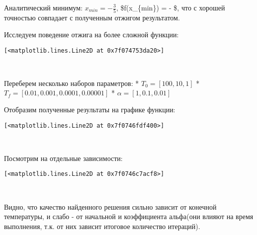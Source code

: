 \documentclass{article}
\begin{document}
    Аналитический минимум: \(x_{min} = -\frac{3}{5}\), \$f(x\_\{min\}) =
- \$, что с хорошей точностью совпадает с полученным отжигом
результатом.

    Исследуем поведение отжига на более сложной функции:

    
    
    \begin{verbatim}
[<matplotlib.lines.Line2D at 0x7f074753da20>]
    \end{verbatim}

    

    \begin{center}
    \end{center}
    { \hspace*{\fill} \\}
    
    Переберем несколько наборов параметров: * \(T_0 = [100, 10, 1]\) *
\(T_f = [0.01, 0.001, 0.0001, 0.00001]\) * \(\alpha = [1, 0.1, 0.01]\)

    Отобразим полученные результаты на графике функции:

    
    
    \begin{verbatim}
[<matplotlib.lines.Line2D at 0x7f0746fdf400>]
    \end{verbatim}

    

    \begin{center}
    \end{center}
    { \hspace*{\fill} \\}
    
    Посмотрим на отдельные зависимости:

    
    
    \begin{verbatim}
[<matplotlib.lines.Line2D at 0x7f0746c7acf8>]
    \end{verbatim}

    

    \begin{center}
    \end{center}
    { \hspace*{\fill} \\}
    
    Видно, что качество найденного решения сильно зависит от конечной
температуры, и слабо - от начальной и коэффициента альфа(они влияют на
время выполнения, т.к. от них зависит итоговое количество итераций).


    
    
    
    
\end{document}
